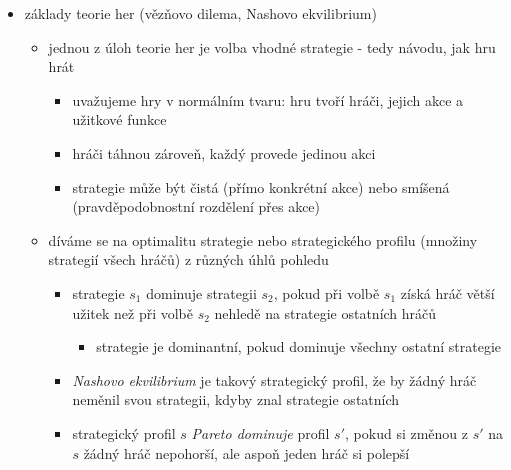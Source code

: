 \begin{itemize}
\begin{itemize}
\begin{itemize}
\begin{itemize}
\item pokud je tohle prozatímní minimum menší než prozatímní maximum (ve vyšší úrovni), tak už ty další větve nemusíme procházet, protože výsledné minimum nemůže být větší než prozatímní minimum
\end{itemize}
\item alfa-beta prořezávání nemá vliv na výsledek algoritmu
\item záleží na pořadí, ve kterém tahy (větve) procházíme
\item minimax se obvykle používá rekurzivně, meze určující prořezávání (pro jednoho hráče je to maximum, pro druhého minimum) se do funkce předávají jako parametry alfa a beta
\end{itemize}
\end{itemize}
\item základy teorie her (vězňovo dilema, Nashovo ekvilibrium)
\begin{itemize}
\item jednou z úloh teorie her je volba vhodné strategie - tedy návodu, jak hru hrát
\begin{itemize}
\item uvažujeme hry v normálním tvaru: hru tvoří hráči, jejich akce a užitkové funkce
\item hráči táhnou zároveň, každý provede jedinou akci
\item strategie může být čistá (přímo konkrétní akce) nebo smíšená (pravděpodobnostní rozdělení přes akce)
\end{itemize}
\item díváme se na optimalitu strategie nebo strategického profilu (množiny strategií všech hráčů) z různých úhlů pohledu
\begin{itemize}
\item strategie $s_1$ dominuje strategii $s_2$, pokud při volbě $s_1$ získá hráč větší užitek než při volbě $s_2$ nehledě na strategie ostatních hráčů
\begin{itemize}
\item strategie je dominantní, pokud dominuje všechny ostatní strategie
\end{itemize}
\item \textit{Nashovo ekvilibrium} je takový strategický profil, že by žádný hráč neměnil svou strategii, kdyby znal strategie ostatních
\item strategický profil $s$ \textit{Pareto dominuje} profil $s'$, pokud si změnou z $s'$ na $s$ žádný hráč nepohorší, ale aspoň jeden hráč si polepší
\begin{itemize}

\end{itemize}
\end{itemize}
\end{itemize}
\end{itemize}
